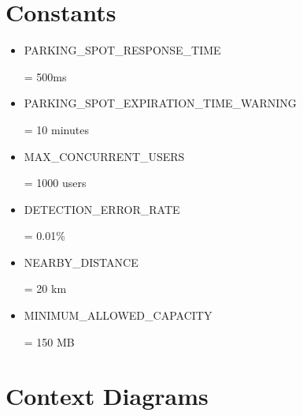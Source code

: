 \documentclass[]{article}
\begin{document}
\section{Constants}

\begin{itemize}
	\item \hypertarget{RESPONSETIME}{PARKING\_SPOT\_RESPONSE\_TIME} = 500ms 

	\item \hypertarget{EXPTIME}{PARKING\_SPOT\_EXPIRATION\_TIME\_WARNING }= 10 minutes


	\item \hypertarget{CONCUSERS}{MAX\_CONCURRENT\_USERS} = 1000 users

	\item \hypertarget{DETERR}{DETECTION\_ERROR\_RATE} = 0.01\%
	
	\item \hypertarget{NBDST}{NEARBY\_DISTANCE} = 20 km
	
	\item \hypertarget{MINCAP}{MINIMUM\_ALLOWED\_CAPACITY} = 150 MB
\end{itemize}
\section{Context Diagrams}
\end{document}
